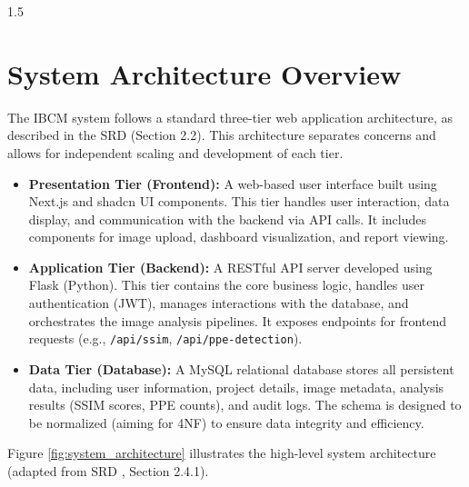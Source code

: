 \documentclass[12pt,a4paper]{report}
\begin{document}
\begin{spacing}{1.5}
    \section{System Architecture Overview}
    The IBCM system follows a standard three-tier web application architecture, as described in the SRD \cite{SRD_IBCM} (Section 2.2). This architecture separates concerns and allows for independent scaling and development of each tier.
    \begin{itemize}
        \item \textbf{Presentation Tier (Frontend):} A web-based user interface built using Next.js and shadcn UI components. This tier handles user interaction, data display, and communication with the backend via API calls. It includes components for image upload, dashboard visualization, and report viewing.
        \item \textbf{Application Tier (Backend):} A RESTful API server developed using Flask (Python). This tier contains the core business logic, handles user authentication (JWT), manages interactions with the database, and orchestrates the image analysis pipelines. It exposes endpoints for frontend requests (e.g., \texttt{/api/ssim}, \texttt{/api/ppe-detection}).
        \item \textbf{Data Tier (Database):} A MySQL relational database stores all persistent data, including user information, project details, image metadata, analysis results (SSIM scores, PPE counts), and audit logs. The schema is designed to be normalized (aiming for 4NF) to ensure data integrity and efficiency.
    \end{itemize}

    Figure \ref{fig:system_architecture} illustrates the high-level system architecture (adapted from SRD \cite{SRD_IBCM}, Section 2.4.1).

    \begin{figure}[H]
        \centering
\end{figure}
\end{spacing}
\end{document}
